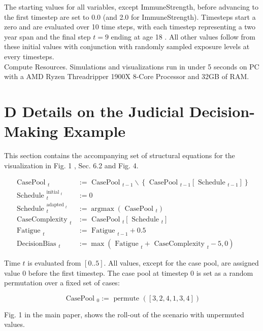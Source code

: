 \documentclass[10pt]{article}
\begin{document}
The starting values for all variables, except ImmuneStrength, before advancing to the first timestep are set to 0.0 (and 2.0 for ImmuneStrength). Timesteps start a zero and are evaluated over 10 time steps, with each timestep representing a two year span and the final step $t=9$ ending at age 18 . All other values follow from these initial values with conjunction with randomly sampled exposure levels at every timesteps.\\
Compute Resources. Simulations and visualizations run in under 5 seconds on PC with a AMD Ryzen Threadripper 1900X 8-Core Processor and 32GB of RAM.

\section*{D Details on the Judicial Decision-Making Example}
This section contains the accompanying set of structural equations for the visualization in Fig. 1 , Sec. 6.2 and Fig. 4.


\begin{align*}
\text { CasePool }_{t} & :=\text { CasePool }_{t-1} \backslash\left\{\text { CasePool }_{t-1}\left[\text { Schedule }_{t-1}\right]\right\}  \tag{13}\\
\text { Schedule }_{t}^{\text {initial }_{t}} & :=0  \tag{14}\\
\text { Schedule }_{t}^{\text {adapted }_{t}} & :=\operatorname{argmax}\left(\text { CasePool }_{t}\right)  \tag{15}\\
\text { CaseComplexity }_{t} & :=\text { CasePool }_{t}\left[\text { Schedule }_{t}\right]  \tag{16}\\
\text { Fatigue }_{t} & :=\text { Fatigue }_{t-1}+0.5  \tag{17}\\
\text { DecisionBias }_{t} & :=\max \left(\text { Fatigue }_{t}+\text { CaseComplexity }_{t}-5,0\right) \tag{18}
\end{align*}


Time $t$ is evaluated from $[0 . .5]$. All values, except for the case pool, are assigned value 0 before the first timestep. The case pool at timestep 0 is set as a random permutation over a fixed set of cases:


\begin{equation*}
\text { CasePool }_{0}:=\text { permute }([3,2,4,1,3,4]) \tag{19}
\end{equation*}


Fig. 1 in the main paper, shows the roll-out of the scenario with unpermuted values.
\end{document}

